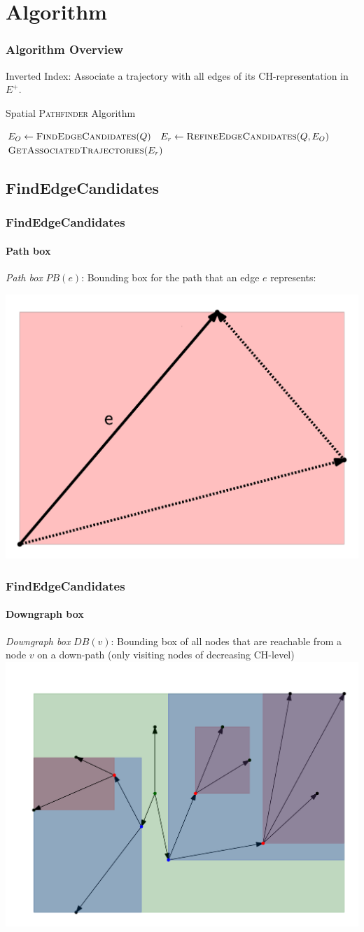 \documentclass{beamer}
\newcommand{\pathfinder}{\textsc{Pathfinder}\xspace}
\newcommand{\findEdgeCandidates}{FindEdgeCandidates\xspace}
\newcommand{\refineEdgeCandidates}{RefineEdgeCandidates\xspace}
\newcommand{\getAssociatedTrajectories}{GetAssociatedTrajectories\xspace}
\newcommand{\chrep}{CH-representation\xspace}
\begin{document}
\section{Algorithm}

\begin{frame}
	\frametitle{Algorithm Overview}
	Inverted Index: Associate a trajectory with all edges of its \chrep in $E^+$. \pause
	\begin{algorithm}[H]
		\renewcommand{\thealgorithm}{}
		{\small
			\caption{Spatial \pathfinder Algorithm}
			\begin{algorithmic}[1]
				 \pause
				\State $E_O \gets \Call{\findEdgeCandidates}{Q}$ \label{line:edge_revrieval} \pause
				\State $E_r \gets \Call{\refineEdgeCandidates}{Q, E_O}$ \pause
				\State \Return $\Call{\getAssociatedTrajectories}{E_r}$
				\EndProcedure
			\end{algorithmic}
			\label{alg:spatial_pathfinder}
		}
	\end{algorithm}
\end{frame}

\subsection{\findEdgeCandidates}
\begin{frame}
	\frametitle{\findEdgeCandidates}
	\framesubtitle{Path box}
	\emph{Path box} $PB(e)$: Bounding box for the path that an edge $e$ represents:

	\includegraphics[width=.5\columnwidth]{images/pathBox}
\end{frame}

\begin{frame}
	\frametitle{\findEdgeCandidates}
	\framesubtitle{Downgraph box}
	\emph{Downgraph box} $DB(v)$: Bounding box of all nodes that are reachable from a node $v$ on a down-path (only visiting nodes of decreasing CH-level)
	\includegraphics[width=.76\columnwidth]{images/downgraphBox}
\end{frame}
\end{document}
